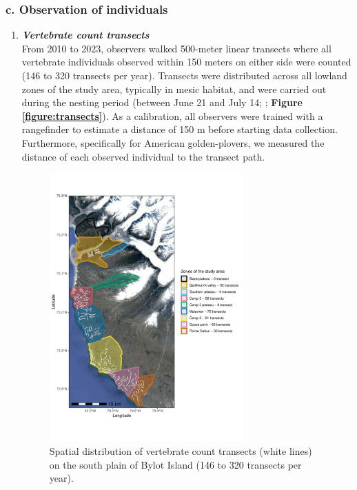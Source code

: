 \documentclass[a4paper,twoside,12pt]{article}
\begin{document}
\subsubsection*{c. Observation of individuals}
\begin{enumerate}[label=\roman*]
\item[] \textit{\textbf{Vertebrate count transects}}\\
From 2010 to 2023, observers walked 500-meter linear transects where all vertebrate individuals observed within 150 meters on either side were counted (146 to 320 transects per year). Transects were distributed across all lowland zones of the study area, typically in mesic habitat, and were carried out during the nesting period (between June 21 and July 14; \citet{lamarre2017, duchesne2021}; \textbf{Figure \ref{figure:transects}}). As a calibration, all observers were trained with a rangefinder to estimate a distance of 150 m before starting data collection. Furthermore, specifically for American golden-plovers, we measured the distance of each observed individual to the transect path.
\\
\begin{figure}
\centering
  \includegraphics[width=0.7\textwidth, angle=0]{figures/transects.pdf}
  \vspace{-35pt} %
  \caption{Spatial distribution of vertebrate count transects (white lines) on the south plain of Bylot Island (146 to 320 transects per year).}

\end{figure}
\end{enumerate}
\end{document}
